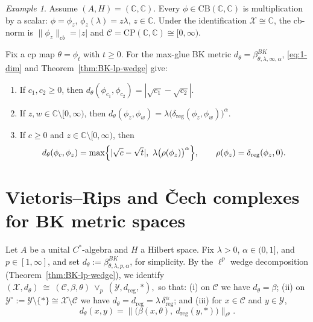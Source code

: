 \documentclass[11pt]{amsart}
\theoremstyle{definition}
\theoremstyle{remark}
\newtheorem{example}[theorem]{Example}
\newcommand{\C}{\mathbb C}
\newcommand{\1}{\mathbbm{1}}
\newcommand{\CP}{\mathrm{CP}}
\newcommand{\CB}{\mathrm{CB}}
\begin{document}
\begin{example}
Assume $(A,H)=(\C,\C)$. Every $\phi\in\CB(\C,\C)$ is multiplication by a scalar: $\phi=\phi_z$, $\phi_z(\lambda)=z\lambda$, $z\in\C$.
Under the identification $\mathcal X\cong\C$, the cb-norm is $\|\phi_z\|_{cb}=|z|$ and
$\mathcal C=\CP(\C,\C)\cong [0,\infty)$.

Fix a cp map $\theta=\phi_t$ with $t\ge 0$. For the max-glue BK metric $d_\theta=\beta^{BK}_{\theta,\lambda,\infty,\alpha}$,
\eqref{eq:1-dim} and Theorem~\ref{thm:BK-lp-wedge} give:
\begin{enumerate}[label=\textup{(\roman*)}]
\item If $c_1,c_2\ge 0$, then $d_\theta(\phi_{c_1},\phi_{c_2})=|\sqrt{c_1}-\sqrt{c_2}|$.
\item If $z,w\in\C\setminus[0,\infty)$, then $d_\theta(\phi_z,\phi_w)=\lambda\bigl(\delta_{\mathrm{reg}}(\phi_z,\phi_w)\bigr)^\alpha$.
\item If $c\ge 0$ and $z\in\C\setminus[0,\infty)$, then
\[
d_\theta(\phi_c,\phi_z)=\max\Bigl\{|\sqrt c-\sqrt t|,\ \lambda\bigl(\rho(\phi_z)\bigr)^\alpha\Bigr\},
\qquad
\rho(\phi_z)=\delta_{\mathrm{reg}}(\phi_z,0).
\]
\end{enumerate}
\end{example}

\section{Vietoris--Rips and \v{C}ech complexes for BK metric spaces}

Let $A$ be a unital $C^*$-algebra and $H$ a Hilbert space. Fix $\lambda>0$, $\alpha\in(0,1]$, and $p\in[1,\infty]$, and set $d_\theta:=\beta^{BK}_{\theta,\lambda,p,\alpha}$, for simplicity. By the $\ell^p$ wedge decomposition (Theorem~\ref{thm:BK-lp-wedge}), we identify
$(\mathcal X,d_\theta)\ \cong\ (\mathcal C,\beta,\theta)\ \vee_p\ (\mathcal Y,d_{\mathrm{reg}},\ast),$
so that: (i) on $\mathcal C$ we have $d_\theta=\beta$; (ii)
on $\mathcal Y^\circ:=\mathcal Y\setminus\{\ast\}\cong \mathcal X\setminus\mathcal C$ we have
      $d_\theta=d_{\mathrm{reg}}=\lambda\,\delta_{\mathrm{reg}}^\alpha$; and 
(iii) for $x\in\mathcal C$ and $y\in\mathcal Y$,
\begin{equation}\label{eq:cross-distance}
d_\theta(x,y)=\bigl\|\bigl(\beta(x,\theta),\ d_{\mathrm{reg}}(y,\ast)\bigr)\bigr\|_{\ell^p}.
\end{equation}
\end{document}
